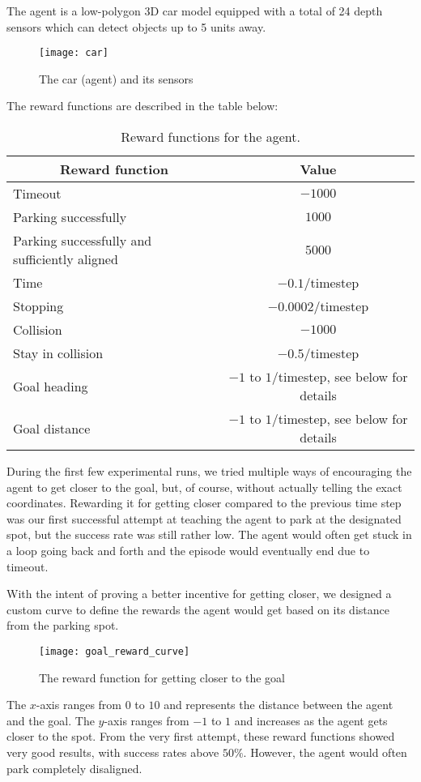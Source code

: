The agent is a low-polygon 3D car model equipped with a total of 24 depth sensors which can detect objects up to 5 units away.
\begin{figure}[H]
    \texttt{[image: car]}
    \caption{The car (agent) and its sensors}
\end{figure}
The reward functions are described in the table below:
\begin{table}[H]
\begin{tabular}{|l|c|}
\hline \multicolumn{1}{|c|}{ Reward function } & Value \\
\hline Timeout & $-1000$ \\
\hline Parking successfully & $1000$ \\
\hline Parking successfully and sufficiently aligned & $5000$ \\
\hline Time & $-0.1$/timestep \\
\hline Stopping & $-0.0002$/timestep \\
\hline Collision & $-1000$ \\
\hline Stay in collision & $-0.5$/timestep \\
\hline Goal heading & $-1$ to $1$/timestep, see below for details\\
\hline Goal distance & $-1$ to $1$/timestep, see below for details\\
\hline
\end{tabular}
\caption{\label{tab:rewards}Reward functions for the agent.}
\end{table}
During the first few experimental runs, we tried multiple ways of encouraging the agent to get closer to the goal, but, of course, without actually telling the exact coordinates. Rewarding it for getting closer compared to the previous time step was our first successful attempt at teaching the agent to park at the designated spot, but the success rate was still rather low. The agent would often get stuck in a loop going back and forth and the episode would eventually end due to timeout.

With the intent of proving a better incentive for getting closer, we designed a custom curve to define the rewards the agent would get based on its distance from the parking spot.
\begin{figure}[H]
    \texttt{[image: goal\_reward\_curve]}
    \caption{The reward function for getting closer to the goal}
    \label{fig:goaldist}
\end{figure}
The $x$-axis ranges from $0$ to $10$ and represents the distance between the agent and the goal. The $y$-axis ranges from $-1$ to $1$ and increases as the agent gets closer to the spot. From the very first attempt, these reward functions showed very good results, with success rates above $50\%$. However, the agent would often park completely disaligned.

